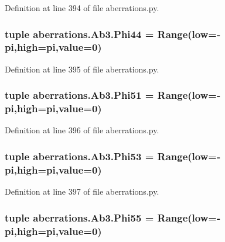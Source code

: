 Definition at line 394 of file aberrations.\-py.

\hypertarget{classaberrations_1_1_ab3_a8191c01c9efa7a49e5e43e6b3d031e7a}{
\subsubsection[{Phi44}]{\setlength{\rightskip}{0pt plus 5cm}tuple aberrations.\-Ab3.\-Phi44 = Range(low=-\/pi,high=pi,{\bf value}=0)\hspace{0.3cm}{\ttfamily [static]}}}\label{classaberrations_1_1_ab3_a8191c01c9efa7a49e5e43e6b3d031e7a}


Definition at line 395 of file aberrations.\-py.

\hypertarget{classaberrations_1_1_ab3_a1448cd5acb7118a4c93cfdff5afe3f3f}{
\subsubsection[{Phi51}]{\setlength{\rightskip}{0pt plus 5cm}tuple aberrations.\-Ab3.\-Phi51 = Range(low=-\/pi,high=pi,{\bf value}=0)\hspace{0.3cm}{\ttfamily [static]}}}\label{classaberrations_1_1_ab3_a1448cd5acb7118a4c93cfdff5afe3f3f}


Definition at line 396 of file aberrations.\-py.

\hypertarget{classaberrations_1_1_ab3_a3f8f632e92a660cfa108afd8ae2927e3}{
\subsubsection[{Phi53}]{\setlength{\rightskip}{0pt plus 5cm}tuple aberrations.\-Ab3.\-Phi53 = Range(low=-\/pi,high=pi,{\bf value}=0)\hspace{0.3cm}{\ttfamily [static]}}}\label{classaberrations_1_1_ab3_a3f8f632e92a660cfa108afd8ae2927e3}


Definition at line 397 of file aberrations.\-py.

\hypertarget{classaberrations_1_1_ab3_a62822777a276703a3a3c7941010d2ec1}{
\subsubsection[{Phi55}]{\setlength{\rightskip}{0pt plus 5cm}tuple aberrations.\-Ab3.\-Phi55 = Range(low=-\/pi,high=pi,{\bf value}=0)\hspace{0.3cm}{\ttfamily [static]}}}\label{classaberrations_1_1_ab3_a62822777a276703a3a3c7941010d2ec1}


